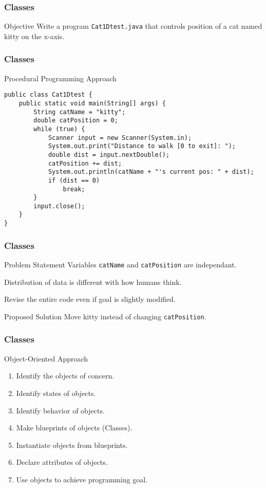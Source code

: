 \documentclass[10pt, compress]{beamer}
\begin{document}
\begin{frame}[fragile]
	\frametitle{Classes}
	\begin{block}{Objective}
	Write a program \texttt{Cat1Dtest.java} that controls position of a cat named kitty on the x-axis.
	\end{block}
\end{frame}

\begin{frame}[fragile]
	\frametitle{Classes}
	\begin{block}{Procedural Programming Approach}
		\begin{verbatim}
public class Cat1Dtest {
	public static void main(String[] args) {
		String catName = "kitty";
		double catPosition = 0;
		while (true) {
			Scanner input = new Scanner(System.in);
			System.out.print("Distance to walk [0 to exit]: ");
			double dist = input.nextDouble();
			catPosition += dist;
			System.out.println(catName + "'s current pos: " + dist);
			if (dist == 0)
				break;
		}
		input.close();
	}
}
		\end{verbatim}
	\end{block}
\end{frame}

\begin{frame}[fragile]
	\frametitle{Classes}
	\begin{block}{Problem Statement}
	Variables \texttt{catName} and \texttt{catPosition} are independant.

	Distribution of data is different with how humans think.

	Revise the entire code even if goal is slightly modified.
	\end{block}
	\begin{block}{Proposed Solution}
	Move \alert{kitty} instead of changing \texttt{catPosition}.
	\end{block}
\end{frame}

\begin{frame}[fragile]
	\frametitle{Classes}
	\begin{block}{Object-Oriented Approach}
	\begin{enumerate}
		\item[] Identify the objects of concern.
		\item[] Identify states of objects.
		\item[] Identify behavior of objects.
		\item[] Make blueprints of objects (Classes).
		\item[] Instantiate objects from blueprints.
		\item[] Declare attributes of objects.
		\item[] Use objects to achieve programming goal.
	\end{enumerate}
	\end{block}
\end{frame}
\end{document}
